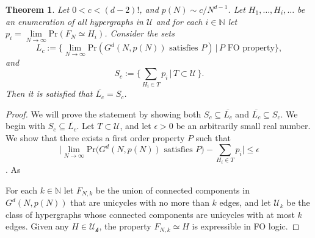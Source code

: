 \documentclass[11pt,notitlepage,a4paper]{article}
\newtheorem{theorem}{Theorem}[section]
\theoremstyle{definition}
\newcommand{\N}{\mathbb{N}}
\newcommand{\LN}{\lim\limits_{N\to \infty}}
\begin{document}
\begin{theorem}
	Let $0<c<(d-2)!$, and $p(N)\sim c/N^{d-1}$. Let 
	$H_1,\dots, H_i,\dots$ be an enumeration of all
	hypergraphs in $\mathcal{U}$ and for each $i\in \N$ 
	let $p_i=\LN \mathrm{Pr}(F_N\simeq H_i)$. 
	Consider the sets 
	\[
	L_c:=\{
	\LN \mathrm{Pr}(G^d(N,p(N)) \text{ satisfies } P) \, | \,
	P \text{ FO property} \},
	\] 
	and 
	\[
	S_c:=\{
	\sum_{H_i\in T} p_i \, | \, T \subset \mathcal{U} \,
	\}.	
	\]
	Then it is satisfied that $\overline{L_c}=S_c$. 		
\end{theorem}
\begin{proof}
	We will prove the statement by showing both 
	$S_c\subseteq \overline{L_c}$ and
	$\overline{L_c}\subseteq S_c$. We begin with 
	$S_c\subseteq \overline{L_c}$. 
	Let $T\subset \mathcal{U}$, and let $\epsilon>0$ be
	an arbitrarily small real number. We show that 
	there exists a first order property $P$ such that
	\[ \Big| \LN \mathrm{Pr}\big( G^d(N,p(N)) \text{ satisfies } P \big) 
	- \sum_{H_i\in T} p_i \Big| \leq \epsilon \].
	As 
	
	
	
	For each $k\in \N$ let $F_{N,k}$ be the union of connected components
	in $G^d(N, p(N))$ that are unicycles with no more than $k$ edges, and let
	$\mathcal{U}_k$ be the class of hypergraphs whose connected components
	are unicycles with at most $k$ edges. 
	Given any $H\in \mathcal{U_k}$, the property $F_{N,k}\simeq H$ is 
	expressible in FO logic. 
	
\end{proof}





\end{document}
